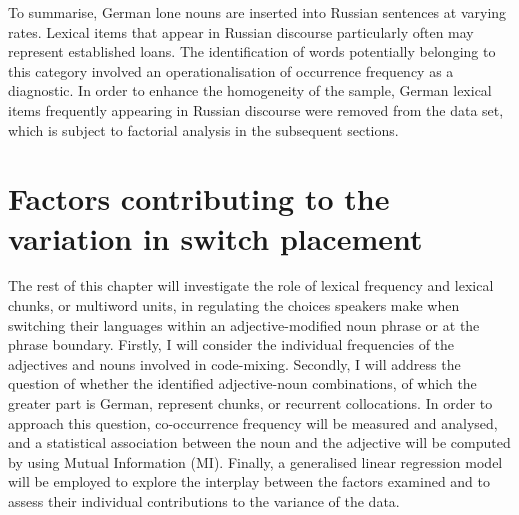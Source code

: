 To summarise, German lone nouns are inserted into Russian sentences at varying rates. Lexical items that appear in Russian discourse particularly often may represent established loans. The identification of words potentially belonging to this category involved an operationalisation of occurrence frequency as a diagnostic. In order to enhance the homogeneity of the sample, German lexical items frequently appearing in Russian discourse were removed from the data set, which is subject to factorial analysis in the subsequent sections.

\section{Factors contributing to the variation in switch placement}\label{sec:factors AN}

The rest of this chapter will investigate the role of lexical frequency and lexical chunks, or multiword units, in regulating the choices speakers make when switching their languages within an adjective-modified noun phrase or at the phrase boundary. Firstly, I will consider the individual frequencies of the adjectives and nouns involved in code-mixing. Secondly, I will  address the question of whether the identified adjective-noun combinations, of which the greater part is German, represent chunks, or recurrent collocations. In order to approach this question, co-occurrence frequency will be measured and analysed, and a statistical association between the noun and the adjective will be computed by using Mutual Information (MI). Finally, a generalised linear regression model will be employed to explore the interplay between the factors examined and to assess their individual contributions to the variance of the data.


